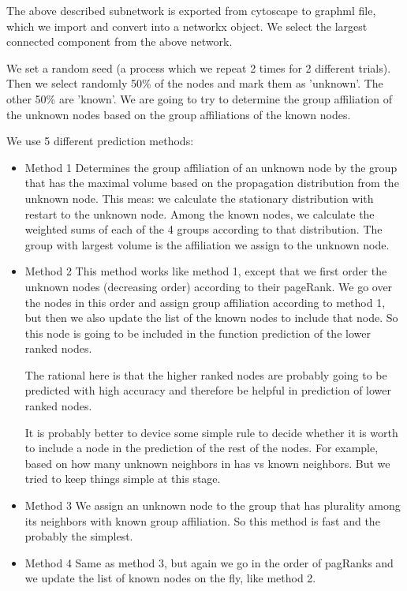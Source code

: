 \documentclass[a4paper,10pt]{article}
\theoremstyle{definition}
\theoremstyle{remark}
\theoremstyle{plain}
\begin{document}
The above described subnetwork is exported from cytoscape to graphml file, which we import 
and convert into a networkx object. 
We select the largest connected component from the above network.

We set a random seed (a process which we repeat 2 times for 2 different trials).
Then we select randomly 50\% of the nodes and mark them as 'unknown'. The other
50\% are 'known'. We are going to try to determine the group affiliation of the
unknown nodes based on the group affiliations of the known nodes.

We use 5 different prediction methods:

\begin{itemize}
\item{Method 1} Determines the group affiliation of an unknown node by the group
that has the maximal volume based on the propagation distribution from the
unknown node. This meas: we calculate the stationary distribution with restart
to the unknown node. Among the known nodes, we calculate the weighted sums of
each of the 4 groups according to that distribution. The group with largest
volume is the affiliation we assign to the unknown node.

\item{Method 2} This method works like method 1, except that we first order the
unknown nodes (decreasing order) according to their pageRank. We go over the
nodes in this order and assign group affiliation according to method 1, but then
we also update the list of the known nodes to include that node. So this node is
going to be included in the function prediction of the lower ranked nodes.

The rational here is that the higher ranked nodes are probably going to be
predicted with high accuracy and therefore be helpful in prediction of lower
ranked nodes. 

It is probably better to device some simple rule to decide whether it is worth
to include a node in the prediction of the rest of the nodes. For example, based
on how many unknown neighbors in has vs known neighbors. But we tried to keep
things simple at this stage.

\item{Method 3} We assign an unknown node to the group that has plurality among
its neighbors with known group affiliation. So this method is fast and the
probably the simplest.

\item{Method 4} Same as method 3, but again we go in the order of pagRanks and
we update the list of known nodes on the fly, like method 2.


\end{itemize}
\end{document}
